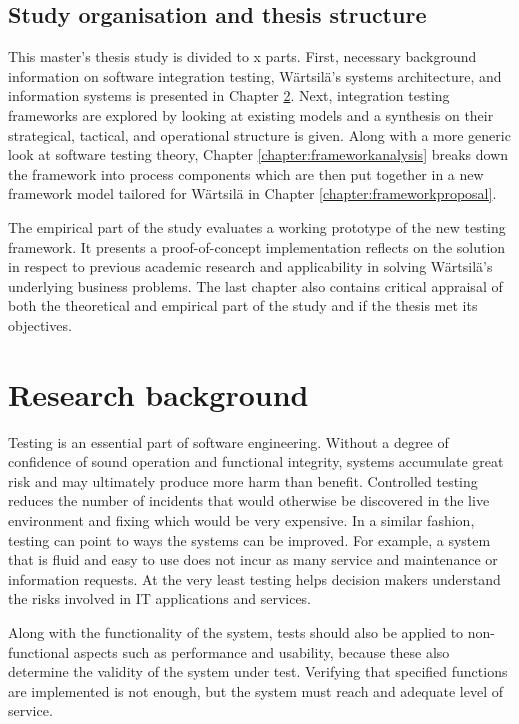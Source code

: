 \documentclass[12pt,a4paper,oneside,pdftex]{report}
\begin{document}

\section{Study organisation and thesis structure}
\label{section:structure}
This master's thesis study is divided to x parts. First, necessary background information on software integration testing, Wärtsilä's systems architecture, and information systems is presented in Chapter \ref{chapter:background}. Next, integration testing frameworks are explored by looking at existing models and a synthesis on their strategical, tactical, and operational structure is given. Along with a more generic look at software testing theory, Chapter \ref{chapter:frameworkanalysis} breaks down the framework into process components which are then put together in a new framework model tailored for Wärtsilä in Chapter \ref{chapter:frameworkproposal}.

The empirical part of the study evaluates a working prototype of the new testing framework. It presents a proof-of-concept implementation reflects on the  solution in respect to previous academic research and applicability in solving Wärtsilä's underlying business problems. The last chapter also contains critical appraisal of both the theoretical and empirical part of the study and if the thesis met its objectives.

\chapter{Research background}
\label{chapter:background}

Testing is an essential part of software engineering. Without a degree of confidence of sound operation and functional integrity, systems accumulate great risk and may ultimately produce more harm than benefit. Controlled testing reduces the number of incidents that would otherwise be discovered in the live environment and fixing which would be very expensive. \citep{jenkins2008software, liu2009unified} In a similar fashion, testing can point to ways the systems can be improved. For example, a system that is fluid and easy to use does not incur as many service and maintenance or information requests. At the very least testing helps decision makers understand the risks involved in IT applications and services.

Along with the functionality of the system, tests should also be applied to non-functional aspects such as performance and usability, because these also determine the validity of the system under test. Verifying that specified functions are implemented is not enough, but the system must reach and adequate level of service.
\end{document}
